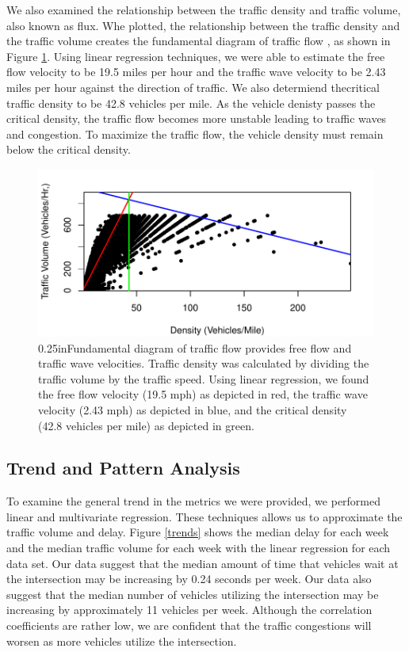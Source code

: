 \documentclass{report}
\begin{document}
We also examined the relationship between the traffic density and traffic volume,
also known as flux. Whe plotted, the relationship between the traffic density
and the traffic volume creates the fundamental diagram of traffic flow
\cite{HCM}, as shown in Figure \ref{fig:Fundamental}. Using linear regression techniques, we
were able to estimate the free flow velocity to be 19.5 miles per hour and the
traffic wave velocity to be 2.43 miles per hour against the direction of traffic.
We also determiend thecritical traffic density to be 42.8 vehicles per mile.
As the vehicle denisty passes the critical density, the traffic flow becomes
more unstable leading to traffic waves and congestion. To maximize
the traffic flow, the vehicle density must remain below the critical density.

\begin{figure}[h]
\centering
\includegraphics{upstat_report-003}
\caption{\rightskip0.25inFundamental diagram of traffic flow provides
free flow and traffic wave velocities. Traffic density was calculated by
dividing the traffic volume by the traffic speed. Using linear regression, we
found the free flow velocity (19.5 mph) as depicted in red, the traffic wave
velocity (2.43 mph) as depicted in blue, and the critical density (42.8 vehicles
per mile) as depicted in green.}
\label{fig:Fundamental}
\end{figure}


\subsection*{Trend and Pattern Analysis}

To examine the general trend in the metrics we were provided, we performed linear
and multivariate regression. These techniques allows us to approximate the traffic
volume and delay. Figure \ref{trends} shows the median delay for each week and
the median traffic volume for each week with the linear regression for each data
set. Our data suggest that the median amount of time that vehicles wait at the
intersection may be increasing by 0.24 seconds per week. Our data also suggest
that the median number of vehicles utilizing the intersection may be increasing
by approximately 11 vehicles per week. Although the correlation coefficients are
rather low, we are confident that the traffic congestions will worsen as more
vehicles utilize the intersection.
\end{document}
